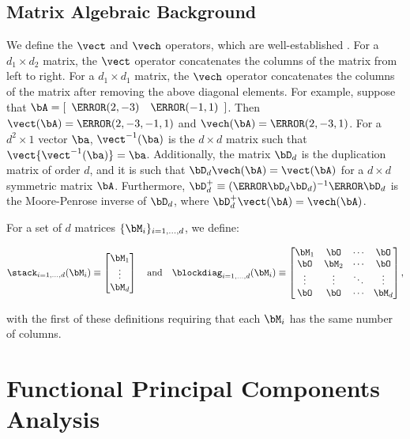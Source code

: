 \documentclass[ba]{imsart}
\numberwithin{equation}{section}
\theoremstyle{plain}
\begin{document}

\subsection{Matrix Algebraic Background}
\label{sec:matrix}

We define the $\vect$ and $\vech$ operators,
which are well-established \citep[e.g.][]{gentle07}.
For a $d_1 \times d_2$ matrix, the $\vect$ operator concatenates the columns of the matrix from left to right.
For a $d_1 \times d_1$ matrix, the $\vech$ operator concatenates the columns of the matrix after removing
the above diagonal elements. For example, suppose that $\bA = [\begin{array}{c c} \T{(2, -3)} & \T{(-1, 1)} \end{array}]$.
Then $\vect (\bA) = \T{(2, -3, -1, 1)}$ and $\vech (\bA) = \T{(2, -3, 1)}$.
For a $d^2 \times 1$ vector
$\ba$, $\vect^{-1} (\ba)$ is the $d \times d$ matrix such that $\vect \{\vect^{-1} (\ba)\} = \ba$. Additionally, the matrix
$\bD_d$ is the duplication matrix of order $d$, and it is such that $\bD_d \vech (\bA) = \vect (\bA)$ for a
$d \times d$ symmetric matrix $\bA$. Furthermore, $\bD_d^{+} \equiv (\T{\bD_d} \bD_d)^{-1} \T{\bD_d}$ is the
Moore-Penrose inverse of $\bD_d$, where $\bD_d^+ \vect (\bA) = \vech(\bA)$.

For a set of $d$ matrices $\{ \bM_i \}_{i = 1, \dots, d}$, we define:

\[
	\stack_{i = 1, \dots, d} (\bM_i)
		\equiv
			\begin{bmatrix}
				\bM_1 \\
				\vdots \\
				\bM_d
			\end{bmatrix}
	\quad \text{and} \quad
	\blockdiag_{i = 1, \dots, d} (\bM_i)
		\equiv
			\begin{bmatrix}
				\bM_1 & \bO & \cdots & \bO \\
				\bO & \bM_2 & \cdots & \bO \\
				\vdots & \vdots & \ddots & \vdots \\
				\bO & \bO & \cdots & \bM_d
			\end{bmatrix},
\]

\noindent with the first of these definitions requiring that each $\bM_i$ has the same number of columns.


\section{Functional Principal Components Analysis}
\label{sec:fpca}
\end{document}
